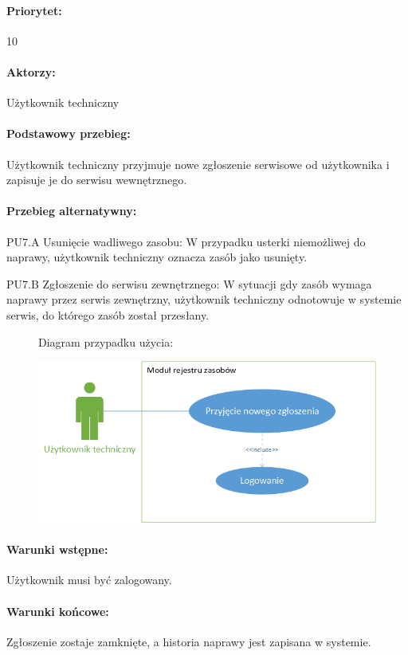 \documentclass[11pt, a4paper, oneside]{report}
\begin{document}
\paragraph{Priorytet:} 10
\paragraph{Aktorzy:} Użytkownik techniczny
\paragraph{Podstawowy przebieg:}
Użytkownik techniczny przyjmuje nowe zgłoszenie serwisowe od użytkownika i zapisuje je do serwisu wewnętrznego.
\paragraph{Przebieg alternatywny:}
PU7.A Usunięcie wadliwego zasobu:
W przypadku usterki niemożliwej do naprawy, użytkownik techniczny oznacza zasób jako usunięty.

PU7.B Zgłoszenie do serwisu zewnętrznego:
W sytuacji gdy zasób wymaga naprawy przez serwis zewnętrzny, użytkownik techniczny odnotowuje w systemie serwis, do którego zasób został przesłany.
\begin{figure}[H]
Diagram przypadku użycia:

\centering
\includegraphics[scale=1]{uzytkownik_tech_serwis.png}
\end{figure}

\paragraph{Warunki wstępne:} Użytkownik musi być zalogowany.
\paragraph{Warunki końcowe:} Zgłoszenie zostaje zamknięte, a historia naprawy jest zapisana w systemie.
\end{document}
